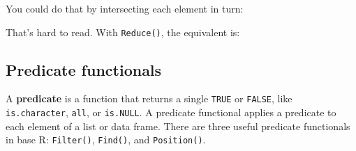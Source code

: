 \begin{Shaded}
\begin{Highlighting}[]
\StringTok{ }\NormalTok{(}\NormalTok{, }\NormalTok{(}\NormalTok{:}\NormalTok{, }\NormalTok{, }  \NormalTok{)}
\end{Highlighting}
\end{Shaded}

You could do that by intersecting each element in turn:

\begin{Shaded}
\begin{Highlighting}[]
\NormalTok{(}\NormalTok{(}\NormalTok{(}\NormalTok{(l[[}\NormalTok{]], l[[}\NormalTok{]]),}
  \NormalTok{l[[}\NormalTok{]]), l[[}\NormalTok{]]), l[[}\NormalTok{]])}
\end{Highlighting}
\end{Shaded}

That's hard to read. With \texttt{Reduce()}, the equivalent is:

\begin{Shaded}
\begin{Highlighting}[]
\end{Highlighting}
\end{Shaded}

\subsection{Predicate functionals}

A \textbf{predicate} is a function that returns a single \texttt{TRUE}
or \texttt{FALSE}, like \texttt{is.character}, \texttt{all}, or
\texttt{is.NULL}. A predicate functional applies a predicate to each
element of a list or data frame. There are three useful predicate
functionals in base R: \texttt{Filter()}, \texttt{Find()}, and
\texttt{Position()}. 

